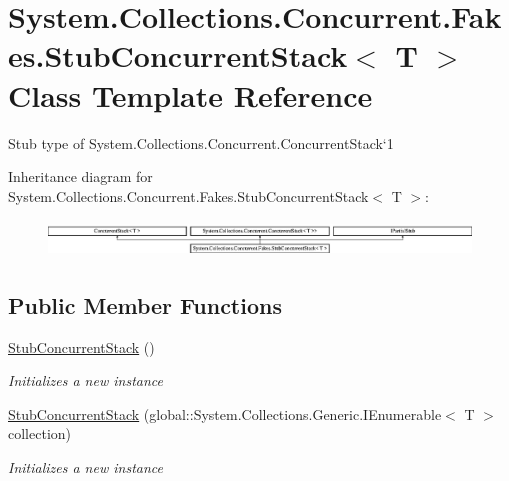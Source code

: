 \hypertarget{class_system_1_1_collections_1_1_concurrent_1_1_fakes_1_1_stub_concurrent_stack_3_01_t_01_4}{\section{System.\-Collections.\-Concurrent.\-Fakes.\-Stub\-Concurrent\-Stack$<$ T $>$ Class Template Reference}
\label{class_system_1_1_collections_1_1_concurrent_1_1_fakes_1_1_stub_concurrent_stack_3_01_t_01_4}
}


Stub type of System.\-Collections.\-Concurrent.\-Concurrent\-Stack`1 


Inheritance diagram for System.\-Collections.\-Concurrent.\-Fakes.\-Stub\-Concurrent\-Stack$<$ T $>$\-:\begin{figure}[H]
\begin{center}
\leavevmode
\includegraphics[height=0.964686cm]{class_system_1_1_collections_1_1_concurrent_1_1_fakes_1_1_stub_concurrent_stack_3_01_t_01_4}
\end{center}
\end{figure}
\subsection*{Public Member Functions}
\begin{DoxyCompactItemize}
\item 
\hyperlink{class_system_1_1_collections_1_1_concurrent_1_1_fakes_1_1_stub_concurrent_stack_3_01_t_01_4_a570b958f8042e430f37b4a2a62488c04}{Stub\-Concurrent\-Stack} ()
\begin{DoxyCompactList}\small\item\em Initializes a new instance\end{DoxyCompactList}\item 
\hyperlink{class_system_1_1_collections_1_1_concurrent_1_1_fakes_1_1_stub_concurrent_stack_3_01_t_01_4_a7a8d5492f2e8530f643f3af6875f9005}{Stub\-Concurrent\-Stack} (global\-::\-System.\-Collections.\-Generic.\-I\-Enumerable$<$ T $>$ collection)
\begin{DoxyCompactList}\small\item\em Initializes a new instance\end{DoxyCompactList}\end{DoxyCompactItemize}
